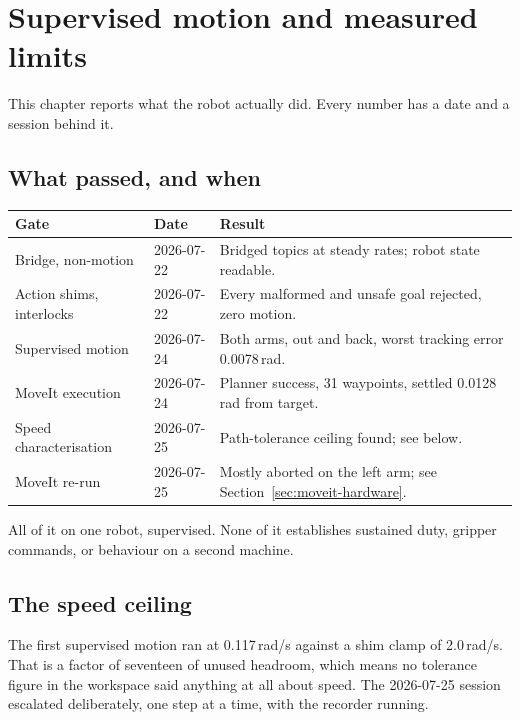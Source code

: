 \chapter{Supervised motion and measured limits}
\label{ch:hwmotion}

This chapter reports what the robot actually did. Every number has a date and a
session behind it.

\section{What passed, and when}

\begin{table}[h]
\centering
\small
\begin{tabularx}{\linewidth}{@{}llX@{}}
\toprule
\textbf{Gate} & \textbf{Date} & \textbf{Result} \\
\midrule
Bridge, non-motion & 2026-07-22 & Bridged topics at steady rates; robot state readable. \\
Action shims, interlocks & 2026-07-22 & Every malformed and unsafe goal rejected, zero motion. \\
Supervised motion & 2026-07-24 & Both arms, out and back, worst tracking error 0.0078\,rad. \\
MoveIt execution & 2026-07-24 & Planner success, 31 waypoints, settled 0.0128\,rad from target. \\
Speed characterisation & 2026-07-25 & Path-tolerance ceiling found; see below. \\
MoveIt re-run & 2026-07-25 & Mostly aborted on the left arm; see Section~\ref{sec:moveit-hardware}. \\
\bottomrule
\end{tabularx}
\end{table}

All of it on one robot, supervised. None of it establishes sustained duty,
gripper commands, or behaviour on a second machine.

\section{The speed ceiling}
\label{sec:speed}

The first supervised motion ran at 0.117\,rad/s against a shim clamp of
2.0\,rad/s. That is a factor of seventeen of unused headroom, which means no
tolerance figure in the workspace said anything at all about speed. The
2026-07-25 session escalated deliberately, one step at a time, with the recorder
running.

